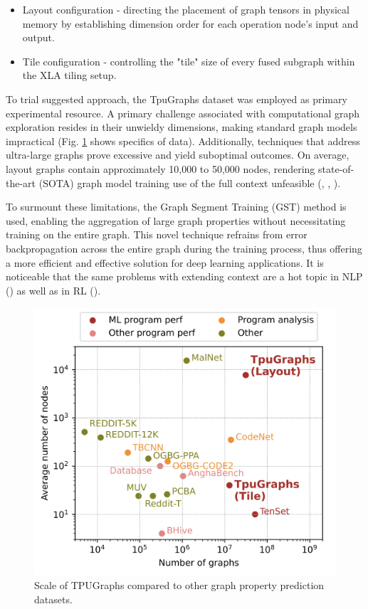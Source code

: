 \documentclass{article}
\begin{document}
\begin{itemize}
\item Layout configuration - directing the placement of graph tensors in physical memory by establishing dimension order for each operation node's input and output.
\item Tile configuration - controlling the "tile" size of every fused subgraph within the XLA tiling setup.
\end{itemize}

To trial suggested approach, the TpuGraphs dataset \cite{mangpo2023tpugraphs} was employed as primary experimental resource. A primary challenge associated with computational graph exploration resides in their unwieldy dimensions, making standard graph models impractical (Fig. \ref{fig:tpu_dataset} shows specifics of data). Additionally, techniques that address ultra-large graphs prove excessive and yield suboptimal outcomes. On average, layout graphs contain approximately 10,000 to 50,000 nodes, rendering state-of-the-art (SOTA) graph model training use of the full context unfeasible (\cite{rampavsek2022recipe}, \cite{chen2022nagphormer}, \cite{zhang2023large}).

To surmount these limitations, the Graph Segment Training (GST) \cite{cao2023learning} method is used, enabling the aggregation of large graph properties without necessitating training on the entire graph. This novel technique refrains from error backpropagation across the entire graph during the training process, thus offering a more efficient and effective solution for deep learning applications.  It is noticeable that the same problems with extending context are a hot topic in NLP (\cite{dai2019transformer}) as well as in RL (\cite{bessonov2023recurrent}).

\begin{figure}
\label{fig:tpu_dataset}
    \centering
    \includegraphics[scale=0.35]{figures/tpu_dataset.png}
    \caption{Scale of TPUGraphs compared to other
graph property prediction datasets.}
\end{figure}
\end{document}
